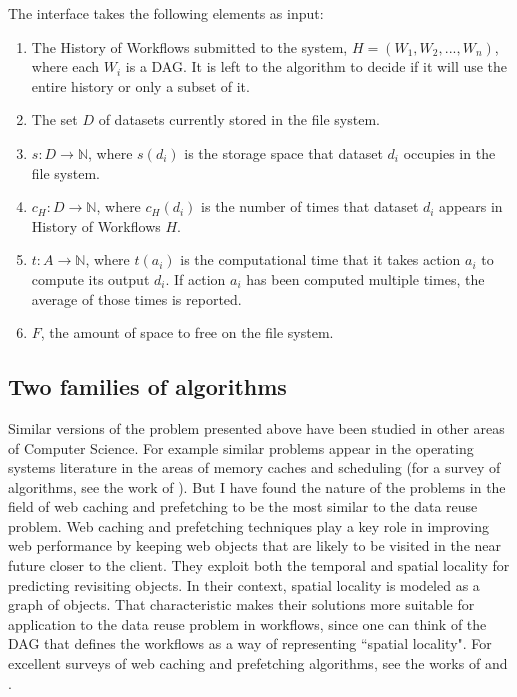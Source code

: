 The interface takes the following elements as input:

\begin{enumerate}
\item The History of Workflows submitted to the system, $H = (W_1, W_2, ..., W_n)$, where each $W_i$ is a DAG. It is left to the algorithm to decide if it will use the entire history or only a subset of it.

\item The set $D$ of datasets currently stored in the file system. 

\item $s: D \to \mathbb{N} $, where $s(d_i)$ is the storage space that dataset $d_i$ occupies in the file system.

\item $c_H: D \to \mathbb{N}$, where $c_H(d_i)$ is the number of times that dataset $d_i$ appears in History of Workflows $H$.

\item $t: A \to \mathbb{N}$, where $t(a_i)$ is the computational time that it takes action $a_i$ to compute its output $d_i$.  If action $a_i$ has been computed multiple times, the average of those times is reported.

\item $F$, the amount of space to free on the file system.

\end{enumerate}

\subsection{Two families of algorithms}
Similar versions of the problem presented above have been studied in other areas of Computer Science.  For example similar problems appear in the operating systems literature in the areas of memory caches \citep{smith1982cache} and scheduling (for a survey of algorithms, see the work of \cite{ramamritham1994scheduling}). But I have found the nature of the problems in the field of web caching and prefetching to be the most similar to the data reuse problem.  Web caching and prefetching techniques play a key role in improving web performance by keeping web objects that are likely to be visited in the near future closer to the client. They exploit both the temporal and spatial locality for predicting revisiting objects. In their context, spatial locality is modeled as a graph of objects. That characteristic makes their solutions more suitable for application to the data reuse problem in workflows, since one can think of the DAG that defines the workflows as a way of representing ``spatial locality".  For excellent surveys of web caching and prefetching algorithms, see the works of \cite{wang1999survey} and \cite{ali2011survey}.

